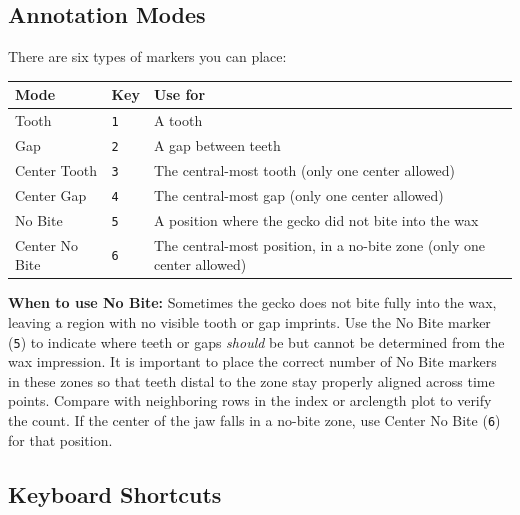 \documentclass[11pt, letterpaper]{article}
\begin{document}
\subsection*{Annotation Modes}

There are six types of markers you can place:

\begin{center}
\begin{tabular}{lll}
\toprule
\textbf{Mode} & \textbf{Key} & \textbf{Use for} \\
\midrule
Tooth           & \texttt{1} & A tooth \\
Gap             & \texttt{2} & A gap between teeth \\
Center Tooth    & \texttt{3} & The central-most tooth (only one center allowed) \\
Center Gap      & \texttt{4} & The central-most gap (only one center allowed) \\
No Bite         & \texttt{5} & A position where the gecko did not bite into the wax \\
Center No Bite  & \texttt{6} & The central-most position, in a no-bite zone (only one center allowed) \\
\bottomrule
\end{tabular}
\end{center}

\begin{notebox}
\textbf{When to use No Bite:} Sometimes the gecko does not bite fully into the wax,
leaving a region with no visible tooth or gap imprints. Use the No Bite marker
(\texttt{5}) to indicate where teeth or gaps \emph{should} be but cannot be
determined from the wax impression. It is important to place the correct number of
No Bite markers in these zones so that teeth distal to the zone stay properly aligned
across time points. Compare with neighboring rows in the index or arclength plot to
verify the count. If the center of the jaw falls in a no-bite zone, use
Center No Bite (\texttt{6}) for that position.
\end{notebox}

\subsection*{Keyboard Shortcuts}
\end{document}
